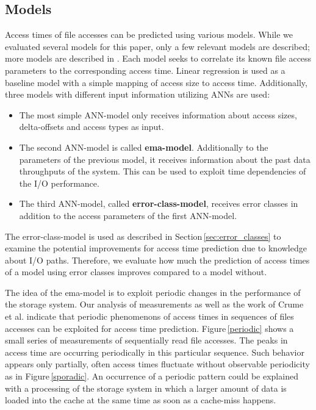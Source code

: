\documentclass{superfri}
\begin{document}
	\subsection{Models}
	Access times of file accesses can be predicted using various models.
	While we evaluated several models for this paper, only a few relevant models are described; more models are described in \cite{VVEIHUDVVN15}. 
	Each model seeks to correlate its known file access parameters to the corresponding access time. 
	Linear regression is used as a baseline model with a simple mapping of access size to access time.
	Additionally, three models with different input information utilizing ANNs are used:
	\begin{itemize}
		\item The most simple ANN-model only receives information about access sizes, delta-offsets and access types as input.
		\item The second ANN-model is called \textbf{ema-model}. Additionally to the parameters of the previous model, it receives information about the past data throughputs of the system. This can be used to exploit time dependencies of the I/O performance.
		\item The third ANN-model, called \textbf{error-class-model}, receives error classes in addition to the access parameters of the first ANN-model.
	\end{itemize}\medskip
	
	The error-class-model is used as described in Section\,\ref{sec:error_classes} to examine the potential improvements for access time prediction due to knowledge about I/O paths.
	Therefore, we evaluate how much the prediction of access times of a model using error classes improves compared to a model without.
	
	The idea of the ema-model is to exploit periodic changes in the performance of the storage system.
	Our analysis of measurements as well as the work of Crume et al. \cite{Crume:2013:FML:2538542.2538561} indicate that periodic phenomenons of access times in sequences of files accesses can be exploited for access time prediction.
	Figure\,\ref{periodic} shows a small series of measurements of sequentially read file accesses.
	The peaks in access time are occurring periodically in this particular sequence. Such behavior appears only partially, often access times fluctuate without observable periodicity as in Figure\,\ref{sporadic}.
	An occurrence of a periodic pattern could be explained with a processing of the storage system in which a larger amount of data is loaded into the cache at the same time as soon as a cache-miss happens.
	
\end{document}
